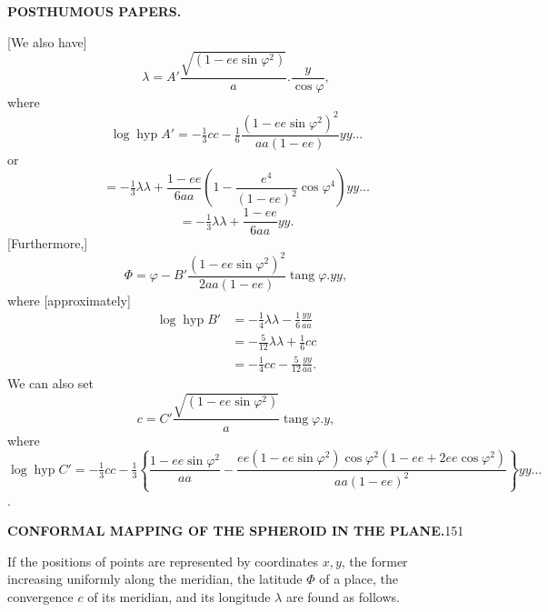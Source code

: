 \par\clearpage
{}\hfill{\small\textbf{POSTHUMOUS PAPERS.}}\hfill\null\par\medskip
{\centering [4.]\par}
[We also have]
\[\lambda=A'\frac{\sqrt{(1-ee\sin\varphi^2)}}a.\frac y{\cos\varphi},\]
\noindent where
\[\log\operatorname{hyp}A'=-\tfrac13cc-\tfrac16\frac{(1-ee\sin\varphi^2)^2}{aa(1-ee)}yy\ldots\]
\noindent or
\[=-\tfrac13\lambda\lambda+\frac{1-ee}{6aa}\left(1-\frac{e^4}{(1-ee)^2}\cos\varphi^4\right)yy\ldots\]
\[=-\tfrac13\lambda\lambda+\frac{1-ee}{6aa}yy.\]
[Furthermore,]
\[\Phi=\varphi-B'\frac{(1-ee\sin\varphi^2)^2}{2aa(1-ee)}\operatorname{tang}\varphi.yy,\]
\noindent where [approximately]
\[
\begin{aligned}
\log\operatorname{hyp}B'&=-\tfrac14\lambda\lambda-\tfrac16\frac{yy}{aa}\\
&=-\tfrac5{12}\lambda\lambda+\tfrac16cc\\
&=-\tfrac14cc-\tfrac5{12}\frac{yy}{aa}.
\end{aligned}
\]
We can also set
\[c=C'\frac{\sqrt{(1-ee\sin\varphi^2)}}a\operatorname{tang}\varphi.y,\]
\noindent where
\[
\log\operatorname{hyp}C'=-\tfrac13cc-\tfrac13\left\{\frac{1-ee\sin\varphi^2}{aa}-\frac{ee(1-ee\sin\varphi^2)\cos\varphi^2(1-ee+2ee\cos\varphi^2)}{aa(1-ee)^2}\right\}yy\ldots
\]
.\]

\par\clearpage
\noindent\null\hfill{\small\textbf{CONFORMAL MAPPING OF THE SPHEROID IN THE PLANE.}}\hfill151\par\medskip
{\centering [5.]\par}
If the positions of points are represented by coordinates \(x,y\), the former increasing uniformly along the meridian, the latitude \(\Phi\) of a place, the convergence \(c\) of its meridian, and its longitude \(\lambda\) are found as follows.

